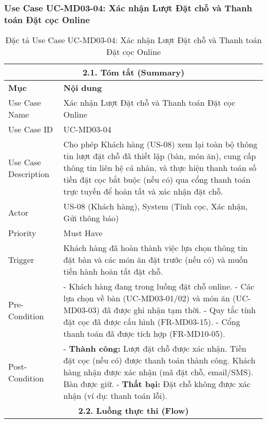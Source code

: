 \subsubsection{Use Case UC-MD03-04: Xác nhận Lượt Đặt chỗ và Thanh toán Đặt cọc Online}
\begin{longtable}{|m{4cm}|p{11cm}|}
\caption{Đặc tả Use Case UC-MD03-04: Xác nhận Lượt Đặt chỗ và Thanh toán Đặt cọc Online} \label{tab:uc_md03_04_revised_v3} \\
\hline
\multicolumn{2}{|c|}{\textbf{2.1. Tóm tắt (Summary)}} \\
\hline
\textbf{Mục} & \textbf{Nội dung} \\
\hline
\endhead %
\hline
\endfoot %
\hline
\endlastfoot %
Use Case Name & Xác nhận Lượt Đặt chỗ và Thanh toán Đặt cọc Online \\
\hline
Use Case ID & UC-MD03-04 \\
\hline
Use Case Description & Cho phép Khách hàng (US-08) xem lại toàn bộ thông tin lượt đặt chỗ đã thiết lập (bàn, món ăn), cung cấp thông tin liên hệ cá nhân, và thực hiện thanh toán số tiền đặt cọc bắt buộc (nếu có) qua cổng thanh toán trực tuyến để hoàn tất và xác nhận đặt chỗ. \\
\hline
Actor & US-08 (Khách hàng), System (Tính cọc, Xác nhận, Gửi thông báo) \\
\hline
Priority & Must Have \\
\hline
Trigger & Khách hàng đã hoàn thành việc lựa chọn thông tin đặt bàn và các món ăn đặt trước (nếu có) và muốn tiến hành hoàn tất đặt chỗ. \\
\hline
Pre-Condition & - Khách hàng đang trong luồng đặt chỗ online. \newline - Các lựa chọn về bàn (UC-MD03-01/02) và món ăn (UC-MD03-03) đã được ghi nhận tạm thời. \newline - Quy tắc tính đặt cọc đã được cấu hình (FR-MD03-15). \newline - Cổng thanh toán đã được tích hợp (FR-MD10-05). \\
\hline
Post-Condition & - \textbf{Thành công:} Lượt đặt chỗ được xác nhận. Tiền đặt cọc (nếu có) được thanh toán thành công. Khách hàng nhận được xác nhận (mã đặt chỗ, email/SMS). Bàn được giữ. \newline - \textbf{Thất bại:} Đặt chỗ không được xác nhận (ví dụ: thanh toán lỗi). \\
\hline
\multicolumn{2}{|c|}{\textbf{2.2. Luồng thực thi (Flow)}} \\

\end{longtable}
